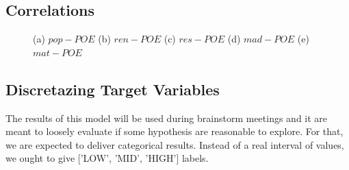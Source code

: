 \documentclass[12pt,letterpaper]{article}
\begin{document}
\subsection{Correlations}
\begin{figure}[h]
    \centering
    \hfil 
    \hfil 
    \caption{(a) $pop - POE$ (b) $ren-POE$ (c) $res-POE$ (d) $mad-POE$ (e) $mat-POE$}
    \label{fig:corr_poe}
\end{figure}


\subsection{Discretazing Target Variables}
The results of this model will be used during brainstorm meetings and
it are meant to loosely evaluate if some hypothesis are reasonable to explore.
For that, we are expected to deliver categorical results. Instead of 
a real interval of values, we ought to give ['LOW', 'MID', 'HIGH'] labels.
\end{document}
